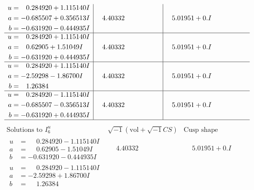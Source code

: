 \documentclass[1p]{elsarticle_modified}
\theoremstyle{definition}
\newcommand{\I}{\sqrt{-1}}
\begin{document}
$$\begin{array}{c|c|c}
\begin{aligned}
u &= \phantom{-}0.284920 + 1.115140 I \\
a &= -0.685507 + 0.356513 I \\
b &= -0.631920 - 0.444935 I\end{aligned}
 & \phantom{-}4.40332\phantom{ +0.000000I} & \phantom{-}5.01951 + 0. I\phantom{ +0.000000I} \\ \hline\begin{aligned}
u &= \phantom{-}0.284920 + 1.115140 I \\
a &= \phantom{-}0.62905 + 1.51049 I \\
b &= -0.631920 + 0.444935 I\end{aligned}
 & \phantom{-}4.40332\phantom{ +0.000000I} & \phantom{-}5.01951 + 0. I\phantom{ +0.000000I} \\ \hline\begin{aligned}
u &= \phantom{-}0.284920 + 1.115140 I \\
a &= -2.59298 - 1.86700 I \\
b &= \phantom{-}1.26384\phantom{ +0.000000I}\end{aligned}
 & \phantom{-}4.40332\phantom{ +0.000000I} & \phantom{-}5.01951 + 0. I\phantom{ +0.000000I} \\ \hline\begin{aligned}
u &= \phantom{-}0.284920 - 1.115140 I \\
a &= -0.685507 - 0.356513 I \\
b &= -0.631920 + 0.444935 I\end{aligned}
 & \phantom{-}4.40332\phantom{ +0.000000I} & \phantom{-}5.01951 + 0. I\phantom{ +0.000000I}\\
 \hline 
 \end{array}$$\newpage$$\begin{array}{c|c|c}  
\text{Solutions to }I^u_{6}& \I (\text{vol} + \sqrt{-1}CS) & \text{Cusp shape}\\
 \hline 
\begin{aligned}
u &= \phantom{-}0.284920 - 1.115140 I \\
a &= \phantom{-}0.62905 - 1.51049 I \\
b &= -0.631920 - 0.444935 I\end{aligned}
 & \phantom{-}4.40332\phantom{ +0.000000I} & \phantom{-}5.01951 + 0. I\phantom{ +0.000000I} \\ \hline\begin{aligned}
u &= \phantom{-}0.284920 - 1.115140 I \\
a &= -2.59298 + 1.86700 I \\
b &= \phantom{-}1.26384\phantom{ +0.000000I}\end{aligned}

\end{array}$$
\end{document}
